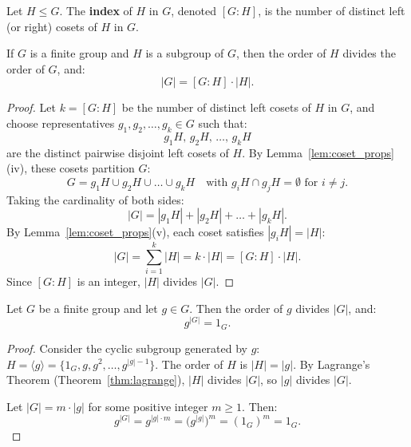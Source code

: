 \begin{definition}
Let $H \le G$. The \textbf{index} of $H$ in $G$, denoted $[G : H]$, is the number of distinct left (or right) cosets of $H$ in $G$.
\end{definition}

\begin{theorem}
\label{thm:lagrange}
If $G$ is a finite group and $H$ is a subgroup of $G$, then the order of $H$ divides the order of $G$, and:
\begin{equation}
|G| = [G : H] \cdot |H|.
\end{equation}
\end{theorem}

\begin{proof}
Let $k = [G : H]$ be the number of distinct left cosets of $H$ in $G$, and choose representatives $g_1, g_2, \dots, g_k \in G$ such that:
\begin{equation*}
g_1 H, \, g_2 H, \, \dots, \, g_k H
\end{equation*}
are the distinct pairwise disjoint left cosets of $H$.
By Lemma~\ref{lem:coset_props}(iv), these cosets partition $G$:
\begin{equation*}
G = g_1 H \cup g_2 H \cup \dots \cup g_k H \quad \text{with } g_i H \cap g_j H = \emptyset \text{ for } i \ne j.
\end{equation*}
Taking the cardinality of both sides:
\begin{equation*}
|G| = |g_1 H| + |g_2 H| + \dots + |g_k H|.
\end{equation*}
By Lemma~\ref{lem:coset_props}(v), each coset satisfies $|g_i H| = |H|$:
\begin{equation*}
|G| = \sum_{i=1}^k |H| = k \cdot |H| = [G : H] \cdot |H|.
\end{equation*}
Since $[G : H]$ is an integer, $|H|$ divides $|G|$.
\end{proof}

\begin{corollary}
\label{cor:element_order_divides}
Let $G$ be a finite group and let $g \in G$. Then the order of $g$ divides $|G|$, and:
\begin{equation}
g^{|G|} = 1_G.
\end{equation}
\end{corollary}

\begin{proof}
Consider the cyclic subgroup generated by $g$: $H = \langle g \rangle = \{ 1_G, g, g^2, \dots, g^{|g|-1} \}$.
The order of $H$ is $|H| = |g|$.
By Lagrange's Theorem (Theorem~\ref{thm:lagrange}), $|H|$ divides $|G|$, so $|g|$ divides $|G|$.

Let $|G| = m \cdot |g|$ for some positive integer $m \ge 1$. Then:
\begin{equation*}
g^{|G|} = g^{|g| \cdot m} = \bigl(g^{|g|}\bigr)^m = (1_G)^m = 1_G.
\end{equation*}
\end{proof}

